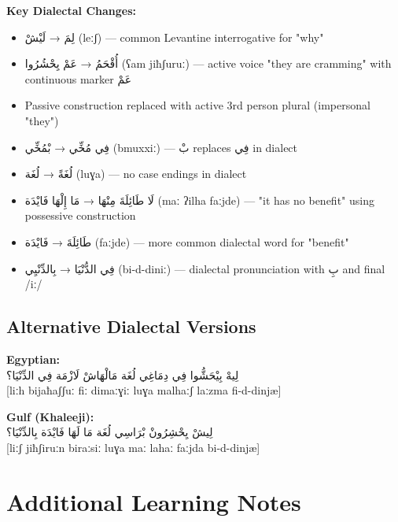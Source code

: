 \documentclass[letterpaper,12pt]{article}
\begin{document}
\textbf{Key Dialectal Changes:}
\begin{itemize}
\item \textarabic{لِمَ} → \textarabic{لَيْشْ} (leːʃ) — common Levantine interrogative for "why"
\item \textarabic{أُقْحَمُ} → \textarabic{عَمْ يِحْشُرُوا} (ʕam jiħʃuruː) — active voice "they are cramming" with continuous marker \textarabic{عَمْ}
\item Passive construction replaced with active 3rd person plural (impersonal "they")
\item \textarabic{فِي مُخِّي} → \textarabic{بْمُخِّي} (bmuxxiː) — \textarabic{بْ} replaces \textarabic{فِي} in dialect
\item \textarabic{لُغَةً} → \textarabic{لُغَة} (luɣa) — no case endings in dialect
\item \textarabic{لَا طَائِلَةَ مِنْهَا} → \textarabic{مَا إِلْهَا فَايْدَة} (maː ʔilha faːjde) — "it has no benefit" using possessive construction
\item \textarabic{طَائِلَةَ} → \textarabic{فَايْدَة} (faːjde) — more common dialectal word for "benefit"
\item \textarabic{فِي الدُّنْيَا} → \textarabic{بِالدِّنْيِي} (bi-d-diniː) — dialectal pronunciation with \textarabic{بِ} and final /iː/
\end{itemize}

\subsection{Alternative Dialectal Versions}

\textbf{Egyptian:}\\
\textarabic{لِيهْ بِيْحَشُّوا فِي دِمَاغِي لُغَة مَالْهَاشْ لَازْمَة فِي الدِّنْيَا؟}\\
{[liːh bijaħaʃʃuː fiː dimaːɣiː luɣa malhaːʃ laːzma fi-d-dinjæ]}

\textbf{Gulf (Khaleeji):}\\
\textarabic{لِيشْ يِحْشِرُونْ بْرَاسِي لُغَة مَا لَهَا فَايْدَة بِالدِّنْيَا؟}\\
{[liːʃ jiħʃiruːn biraːsiː luɣa maː lahaː faːjda bi-d-dinjæ]}

\section{Additional Learning Notes}
\end{document}
